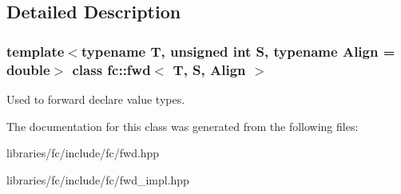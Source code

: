 \subsection{Detailed Description}
\subsubsection*{template$<$typename T, unsigned int S, typename Align = double$>$\newline
class fc\+::fwd$<$ T, S, Align $>$}

Used to forward declare value types. 

The documentation for this class was generated from the following files\+:\begin{DoxyCompactItemize}
\item 
libraries/fc/include/fc/fwd.\+hpp\item 
libraries/fc/include/fc/fwd\+\_\+impl.\+hpp\end{DoxyCompactItemize}
